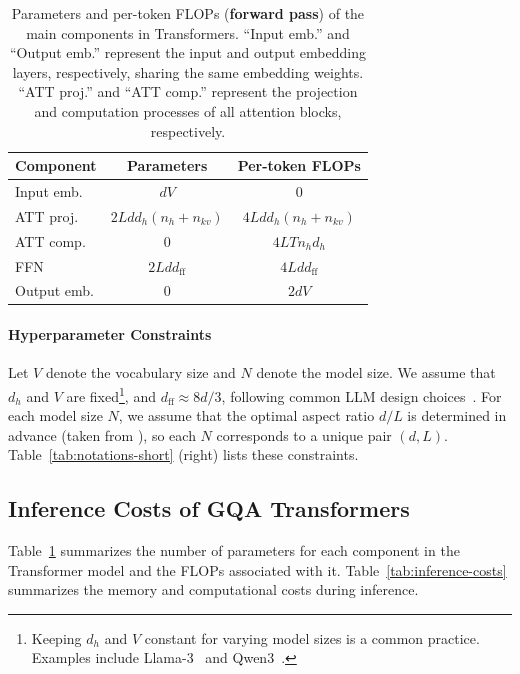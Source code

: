 \documentclass[11pt]{article}
\begin{document}
\begin{table}[!t]
    \small
    \centering
    \begin{tabular}{l|c|c}
        \toprule
        \textbf{Component}  & 
        \textbf{Parameters} & \textbf{Per-token FLOPs} \\
        \midrule
        Input emb.     & $dV$                 & 0 \\
        ATT proj.   & $2Ldd_h(n_h+n_{kv})$ & $4 Ldd_h(n_h + n_{kv})$\\
        ATT comp.   & 0                    & $4 L T  n_hd_h$\\
        FFN          & $2Ldd_\text{ff}$     & $4 Ldd_\text{ff}$ \\
        Output emb.    & 0                    & $2 dV$ \\ 
        \bottomrule
    \end{tabular}
    \caption{Parameters and per-token FLOPs (\textbf{forward pass}) of the main components in Transformers. ``Input emb.'' and ``Output emb.'' represent the input and output embedding layers, respectively, sharing the same embedding weights. ``ATT proj.'' and ``ATT comp.'' represent the projection and computation processes of all attention blocks, respectively.}
    \label{tab:costs-components}
\end{table}

\paragraph{Hyperparameter Constraints}

Let $V$ denote the vocabulary size and $N$ denote the model size. We assume that $d_h$ and $V$ are fixed\footnote{Keeping $d_h$ and $V$ constant for varying model sizes is a common practice. Examples include Llama-3~\citep{llama3} and Qwen3~\citep{qwen3}.}, and $d_\text{ff} \approx 8d/3$, following common LLM design choices~\citep{llama3,olmo,pythia}. For each model size $N$, we assume that the optimal aspect ratio $d/L$ is determined in advance (taken from \citet{pythia}), so each $N$ corresponds to a unique pair $(d, L)$. Table~\ref{tab:notations-short} (right) lists these constraints.



\subsection{Inference Costs of GQA Transformers}
\label{sec:inference-costs}

Table~\ref{tab:costs-components} summarizes the number of parameters for each component in the Transformer model and the FLOPs associated with it. Table~\ref{tab:inference-costs} summarizes the memory and computational costs during inference.
\end{document}
